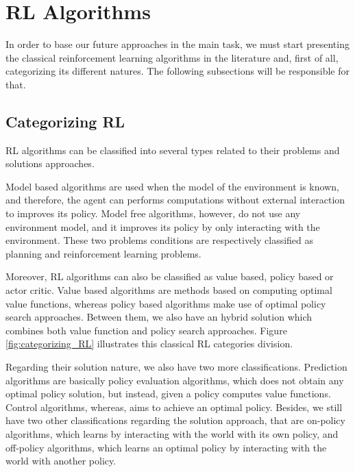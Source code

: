 \section{RL Algorithms}

In order to base our future approaches in the main task, we must start presenting the classical reinforcement learning algorithms in the literature and, first of all, categorizing its different natures. The following subsections will be responsible for that.

\subsection{Categorizing RL}

RL algorithms can be classified into several types related to their problems and solutions approaches.


Model based algorithms are used when the model of the environment is known, and therefore, the agent can performs computations without external interaction to improves its policy. Model free algorithms, however, do not use any environment model, and it improves its policy by only interacting with the environment. These two problems conditions are respectively classified as planning and reinforcement learning problems.

Moreover, RL algorithms can also be classified as value based, policy based or actor critic. Value based algorithms are methods based on computing optimal value functions, whereas policy based algorithms make use of optimal policy search approaches. Between them, we also have an hybrid solution which combines both value function and policy search approaches. Figure \ref{fig:categorizing_RL} illustrates this classical RL categories division.

Regarding their solution nature, we also have two more classifications. Prediction algorithms are basically policy evaluation algorithms, which does not obtain any optimal policy solution, but instead, given a policy computes value functions. Control algorithms, whereas, aims to achieve an optimal policy. Besides, we still have two other classifications regarding the solution approach, that are on-policy algorithms, which learns by interacting with the world with its own policy, and off-policy algorithms, which learns an optimal policy by interacting with the world with another policy.

